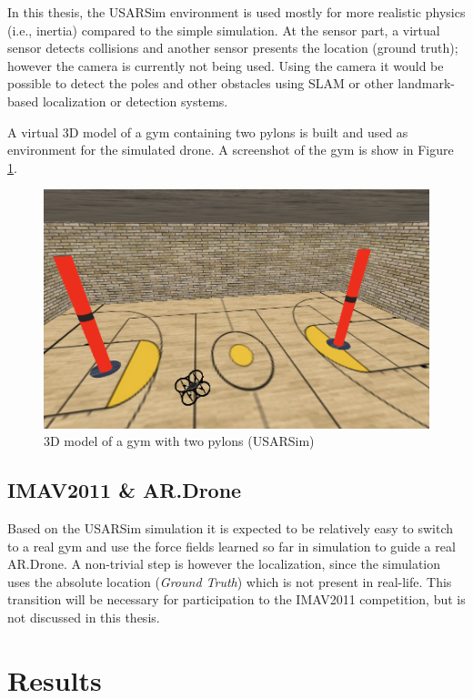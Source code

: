 \documentclass[11pt]{article}
\begin{document}
In this thesis, the USARSim environment is used mostly for more realistic physics (i.e., inertia) compared to the simple simulation. At the sensor part, a virtual sensor detects collisions and another sensor presents the location (ground truth); however the camera is currently not being used. Using the camera it would be possible to detect the poles and other obstacles using SLAM or other landmark-based localization or detection systems.

A virtual 3D model of a gym containing two pylons is built and used as environment for the simulated drone. A screenshot of the gym is show in Figure \ref{fig:gym}.

  \begin{figure}
    \includegraphics[width=1.0\textwidth]{img/gym}
    \caption{3D model of a gym with two pylons (USARSim)}
    \label{fig:gym}
  \end{figure}


\subsection{IMAV2011 \& AR.Drone}
Based on the USARSim simulation it is expected to be relatively easy to switch to a real gym and use the force fields learned so far in simulation to guide a real AR.Drone. A non-trivial step is however the localization, since the simulation uses the absolute location (\emph{Ground Truth}) which is not present in real-life. This transition will be necessary for participation to the IMAV2011 competition, but is not discussed in this thesis.



\pagebreak
\section{Results}
\label{sec:results}
\end{document}
